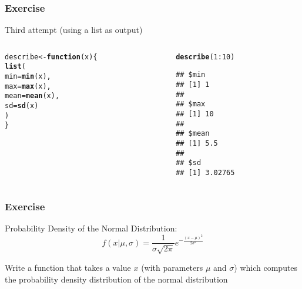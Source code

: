 \documentclass[12pt]{beamer}\usepackage[]{graphicx}\usepackage[]{color}
\makeatletter
\newcommand{\hlnum}[1]{\textcolor[rgb]{0.686,0.059,0.569}{#1}}%
\newcommand{\hlopt}[1]{\textcolor[rgb]{0,0,0}{#1}}%
\newcommand{\hlstd}[1]{\textcolor[rgb]{0.345,0.345,0.345}{#1}}%
\newcommand{\hlkwa}[1]{\textcolor[rgb]{0.161,0.373,0.58}{\textbf{#1}}}%
\newcommand{\hlkwb}[1]{\textcolor[rgb]{0.69,0.353,0.396}{#1}}%
\newcommand{\hlkwc}[1]{\textcolor[rgb]{0.333,0.667,0.333}{#1}}%
\newcommand{\hlkwd}[1]{\textcolor[rgb]{0.737,0.353,0.396}{\textbf{#1}}}%
\newenvironment{kframe}{%
 \def\at@end@of@kframe{}%
 \ifinner\ifhmode%
  \def\at@end@of@kframe{\end{minipage}}%
  \begin{minipage}{\columnwidth}%
 \fi\fi%
 \def\FrameCommand##1{\hskip\@totalleftmargin \hskip-\fboxsep
 \colorbox{shadecolor}{##1}\hskip-\fboxsep
     \hskip-\linewidth \hskip-\@totalleftmargin \hskip\columnwidth}%
 \MakeFramed {\advance\hsize-\width
   \@totalleftmargin\z@ \linewidth\hsize
   \@setminipage}}%
 {\par\unskip\endMakeFramed%
 \at@end@of@kframe}
\newenvironment{knitrout}{}{} %
\makeatother
\begin{document}

\begin{frame}[fragile]
\frametitle{Exercise}

Third attempt (using a list as output)

\begin{columns}[t]
\begin{column}{0.45\textwidth}
\begin{knitrout}\footnotesize
{}\color{fgcolor}\begin{kframe}
\begin{alltt}
\hlstd{describe} \hlkwb{<-} \hlkwa{function}\hlstd{(}\hlkwc{x}\hlstd{) \{}
  \hlkwd{list}\hlstd{(}
    \hlkwc{min} \hlstd{=} \hlkwd{min}\hlstd{(x),}
    \hlkwc{max} \hlstd{=} \hlkwd{max}\hlstd{(x),}
    \hlkwc{mean} \hlstd{=} \hlkwd{mean}\hlstd{(x),}
    \hlkwc{sd} \hlstd{=} \hlkwd{sd}\hlstd{(x)}
  \hlstd{)}
\hlstd{\}}
\end{alltt}
\end{kframe}
\end{knitrout}
\end{column}

\begin{column}{0.4\textwidth}
\begin{knitrout}\footnotesize
{}\color{fgcolor}\begin{kframe}
\begin{alltt}
\hlkwd{describe}\hlstd{(}\hlnum{1}\hlopt{:}\hlnum{10}\hlstd{)}
\end{alltt}
\begin{verbatim}
## $min
## [1] 1
## 
## $max
## [1] 10
## 
## $mean
## [1] 5.5
## 
## $sd
## [1] 3.02765
\end{verbatim}
\end{kframe}
\end{knitrout}
\end{column}
\end{columns}

\end{frame}


\begin{frame}[fragile]
\frametitle{Exercise}

Probability Density of the Normal Distribution:
$$
f(x | \mu, \sigma) = \frac{1}{\sigma \sqrt{2 \pi}} e^{- \frac{(x - \mu)^2}{2 \sigma^2}}
$$

Write a function that takes a value $x$ (with parameters $\mu$ and $\sigma$) which computes the probability density distribution of the normal distribution

\end{frame}
\end{document}
